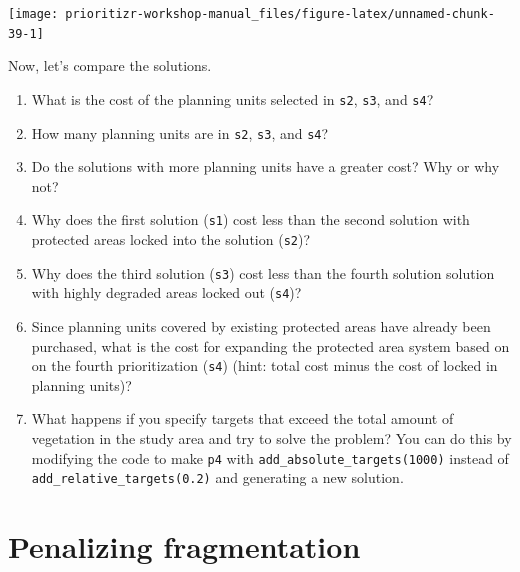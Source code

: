 \documentclass[
  12pt,
]{book}
\makeatletter
\providecommand{\tightlist}{%
  \setlength{\itemsep}{0pt}\setlength{\parskip}{0pt}}
\newenvironment{kframe}{%
\medskip{}
\setlength{\fboxsep}{.8em}
 \def\at@end@of@kframe{}%
 \ifinner\ifhmode%
  \def\at@end@of@kframe{\end{minipage}}%
  \begin{minipage}{\columnwidth}%
 \fi\fi%
 \def\FrameCommand##1{\hskip\@totalleftmargin \hskip-\fboxsep
 \colorbox{shadecolor}{##1}\hskip-\fboxsep
     \hskip-\linewidth \hskip-\@totalleftmargin \hskip\columnwidth}%
 \MakeFramed {\advance\hsize-\width
   \@totalleftmargin\z@ \linewidth\hsize
   \@setminipage}}%
 {\par\unskip\endMakeFramed%
 \at@end@of@kframe}
\newenvironment{rmdblock}[1]
  {
  \begin{itemize}
  \renewcommand{\labelitemi}{
    \raisebox{-.7\height}[0pt][0pt]{
      {\setkeys{Gin}{width=3em,keepaspectratio}\texttt{[image: images/\#1]}}
    }
  }
  \setlength{\fboxsep}{1em}
  \begin{kframe}
  \item
  }
  {
  \end{kframe}
  \end{itemize}
  }
\newenvironment{rmdquestion}
  {\begin{rmdblock}{question}}
  {\end{rmdblock}}
\makeatother
\begin{document}
\begin{center}\texttt{[image: prioritizr-workshop-manual\_files/figure-latex/unnamed-chunk-39-1]} \end{center}

\clearpage

Now, let's compare the solutions.

\begin{rmdquestion}
\begin{enumerate}
\def\labelenumi{\arabic{enumi}.}
\tightlist
\item
  What is the cost of the planning units selected in \texttt{s2}, \texttt{s3}, and \texttt{s4}?
\item
  How many planning units are in \texttt{s2}, \texttt{s3}, and \texttt{s4}?
\item
  Do the solutions with more planning units have a greater cost? Why or why not?
\item
  Why does the first solution (\texttt{s1}) cost less than the second solution with protected areas locked into the solution (\texttt{s2})?
\item
  Why does the third solution (\texttt{s3}) cost less than the fourth solution solution with highly degraded areas locked out (\texttt{s4})?
\item
  Since planning units covered by existing protected areas have already been purchased, what is the cost for expanding the protected area system based on on the fourth prioritization (\texttt{s4}) (hint: total cost minus the cost of locked in planning units)?
\item
  What happens if you specify targets that exceed the total amount of vegetation in the study area and try to solve the problem? You can do this by modifying the code to make \texttt{p4} with \texttt{add\_absolute\_targets(1000)} instead of \texttt{add\_relative\_targets(0.2)} and generating a new solution.
\end{enumerate}
\end{rmdquestion}

\hypertarget{penalizing-fragmentation}{%
\section{Penalizing fragmentation}\label{penalizing-fragmentation}}
\end{document}

